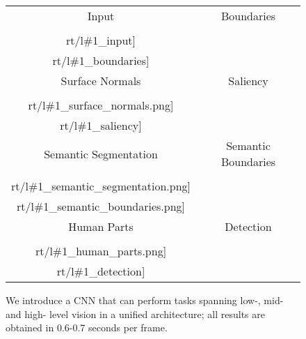 \documentclass[10pt,twocolumn,letterpaper]{article}
\begin{document}
\noindent


\newcommand{\rt}{.}
\newcommand{\wdtg}{.485\linewidth}

\newcommand{\ft}[1]{#1}
\newcommand{\resfigwdf}[1]{
	{ \setlength{\tabcolsep}{.05em}	
		\begin{tabular}{cccc}
			\ft{Input} & \ft{Normals} & \ft{Normals} & \ft{Normals}\\
			\texttt{[image: \\rt/l\#1\_detection]}&
			\texttt{[image: \\rt/l\#1\_boundaries]}&	
			\texttt{[image: \\rt/l\#1\_surface\_normals]}&
			\texttt{[image: \\rt/l\#1\_saliency]}\\
			\texttt{[image: \\rt/l\#1\_detection]}&
			\texttt{[image: \\rt/l\#1\_semantic\_bounaries]}& 
			\texttt{[image: \\rt/\#1\_semantic\_segmentation]}& 
			\texttt{[image: \\rt/\#1\_human\_parts]}
		\end{tabular}
	}
}
\newcommand{\resfigwdt}[1]{
	{\setlength{\tabcolsep}{.2em}	
		\begin{tabular}{cc}
			\ft{Input} & \ft{Boundaries} \\
			\texttt{[image: \\rt/l\#1\_input]}&
			\texttt{[image: \\rt/l\#1\_boundaries]}\\
			 \ft{Surface Normals} & \ft{Saliency}\\	
			\texttt{[image: \\rt/l\#1\_surface\_normals.png]}&
			\texttt{[image: \\rt/l\#1\_saliency]}\\
			 \ft{Semantic Segmentation} & \ft{Semantic Boundaries}\\
			\texttt{[image: \\rt/l\#1\_semantic\_segmentation.png]}&  
			\texttt{[image: \\rt/l\#1\_semantic\_boundaries.png]}\\
			 \ft{Human Parts} &  \ft{Detection} \\
			\texttt{[image: \\rt/l\#1\_human\_parts.png]} & 
			\texttt{[image: \\rt/l\#1\_detection]}
		\end{tabular}
	}
}
\begin{figure}
\resfigwdt{2}	
\caption{We introduce a CNN that can perform tasks spanning low-, mid- and high- level vision in a unified architecture; all results  are obtained in 0.6-0.7 seconds per frame.}
\end{figure}
\end{document}
